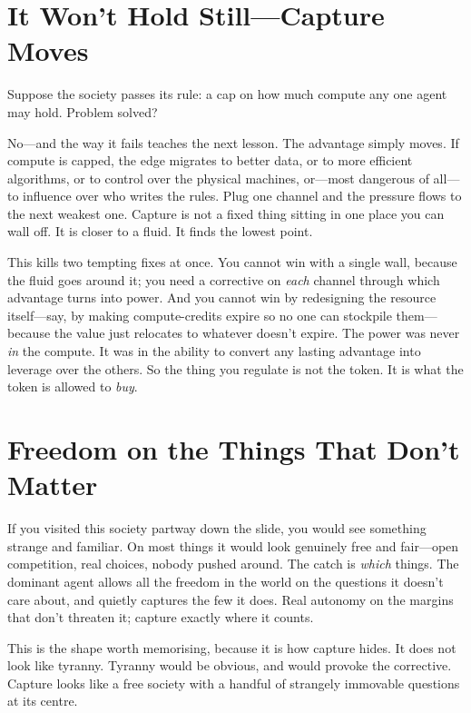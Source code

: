 \documentclass[11pt, a4paper]{report}
\begin{document}

\section{It Won't Hold Still---Capture Moves}

Suppose the society passes its rule: a cap on how much compute any one agent may hold. Problem solved?

No---and the way it fails teaches the next lesson. The advantage simply moves. If compute is capped, the edge migrates to better data, or to more efficient algorithms, or to control over the physical machines, or---most dangerous of all---to influence over who writes the rules. Plug one channel and the pressure flows to the next weakest one. Capture is not a fixed thing sitting in one place you can wall off. It is closer to a fluid. It finds the lowest point.

This kills two tempting fixes at once. You cannot win with a single wall, because the fluid goes around it; you need a corrective on \textit{each} channel through which advantage turns into power. And you cannot win by redesigning the resource itself---say, by making compute-credits expire so no one can stockpile them---because the value just relocates to whatever doesn't expire. The power was never \textit{in} the compute. It was in the ability to convert any lasting advantage into leverage over the others. So the thing you regulate is not the token. It is what the token is allowed to \textit{buy}.


\section{Freedom on the Things That Don't Matter}

If you visited this society partway down the slide, you would see something strange and familiar. On most things it would look genuinely free and fair---open competition, real choices, nobody pushed around. The catch is \textit{which} things. The dominant agent allows all the freedom in the world on the questions it doesn't care about, and quietly captures the few it does. Real autonomy on the margins that don't threaten it; capture exactly where it counts.

This is the shape worth memorising, because it is how capture hides. It does not look like tyranny. Tyranny would be obvious, and would provoke the corrective. Capture looks like a free society with a handful of strangely immovable questions at its centre.
\end{document}
